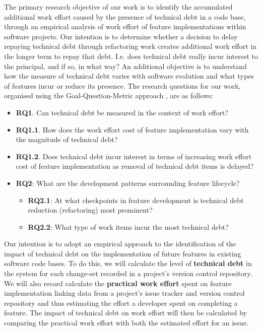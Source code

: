 The primary research objective of our work is to identify the accumulated
additional work effort caused by the presence of technical debt in a code base,
through an empirical analysis of work effort of feature implementations within
software projects.  Our intention is to determine whether a decision to delay
repaying technical debt through refactoring work creates additional work effort
in the longer term to repay that debt. I.e. does technical debt really incur
interest to the principal, and if so, in what way?  An additional objective is
to understand how the measure of technical debt varies with software evolution
and what types of features incur or reduce its presence.  The research questions
for our work, organised using the Goal-Question-Metric approach
\cite{VanSolingen2002}, are as follows:

\begin{itemize}
	\item \textbf{RQ1}. Can technical debt be measured in the context of work
	      effort?

	\item \textbf{RQ1.1}. How does the work effort cost of feature implementation
              vary with the magnitude of technical debt? 

        \item \textbf{RQ1.2}. Does technical debt incur interest in terms of increasing
              work effort cost of feature implementation as removal of technical debt 
              items is delayed?

	\item \textbf{RQ2}: What are the development patterns surrounding feature
	      lifecycle?
	      \begin{itemize}
		      \item \textbf{RQ2.1}: At what checkpoints in feature development
		            is technical debt reduction (refactoring) most prominent?
		      \item \textbf{RQ2.2}: What type of work items incur the most
		            technical debt?
	      \end{itemize}
\end{itemize}

Our intention is to adopt an empirical approach to the identification of the
impact of technical debt on the implementation of future features in existing
software code bases.  To do this, we will calculate the level of
\textbf{technical debt} in the system for each change-set recorded in a
project's version control repository.  We will also record calculate the
\textbf{practical work effort} spent on feature implementation linking data from
a project's issue tracker and version control repository and thus estimating the
effort a developer spent on completing a feature.  The impact of technical debt
on work effort will then be calculated by comparing the practical work effort
with both the estimated effort for an issue.

